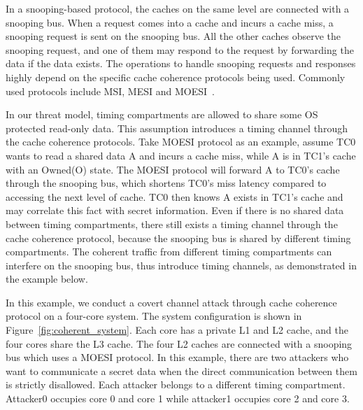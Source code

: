 In a snooping-based protocol, the caches on the same level are connected with a snooping bus. When a request
comes into a cache and incurs a cache miss, a snooping request is sent on the snooping bus. All the other
caches observe the snooping request, and one of them may respond to the request by forwarding the data if 
the data exists. The operations to handle snooping requests and responses highly depend on the specific cache 
coherence protocols being used. Commonly used protocols include MSI, MESI and MOESI~\cite{mark_book}.

In our threat model, timing compartments are allowed to share some OS protected read-only data. This assumption
introduces a timing channel through the cache coherence protocols. Take MOESI protocol as an example, assume TC0 wants
to read a shared data A and incurs a cache miss, while A is in TC1's cache with an Owned(O) state. The MOESI protocol
will forward A to TC0's cache through the snooping bus, which shortens TC0's miss latency compared to accessing the
next level of cache. TC0 then knows A exists in TC1's cache and may correlate this fact with secret information. 
Even if there is no shared data between timing compartments, there still exists a timing channel through the cache
coherence protocol, because the snooping bus is shared by different timing compartments. 
The coherent traffic from different timing compartments can interfere on the snooping bus, thus introduce timing
channels, as demonstrated in the example below.

In this example, we conduct a covert channel attack through cache coherence protocol on a four-core system. 
The system configuration 
is shown in Figure~\ref{fig:coherent_system}. Each core has a private L1 and L2 cache, and the four cores share
the L3 cache. The four L2 caches are connected with a snooping bus which uses a MOESI protocol. 
In this example, there are two attackers who
want to communicate a secret data when the direct communication between them is strictly disallowed. Each attacker 
belongs to a different timing compartment. Attacker0 occupies core 0 and core 1 while attacker1 occupies core 2 and
core 3. 

